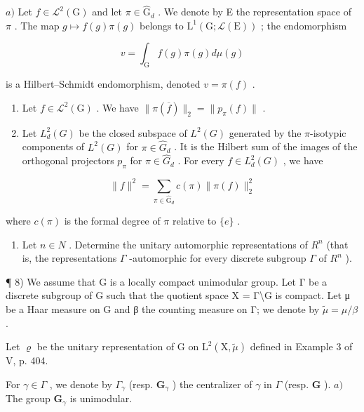 \(a)\) Let \(f \in \mathcal{L}^2(\mathrm{G})\) and let \(\pi \in \widehat{\mathrm{G}}_d\) . We denote by E the representation space of \(\pi\) . The map \(g \mapsto f(g)\pi(g)\) belongs to \(\mathrm{L}^1(\mathrm{G};\mathcal{L}(\mathrm{E}))\) ; the endomorphism

\[
v = \int_ {\mathrm{G}} f (g) \pi (g) d \mu (g)
\]

is a Hilbert--Schmidt endomorphism, denoted \(v = \pi(f)\) .

\begin{enumerate}
\def\labelenumi{\alph{enumi})}
\setcounter{enumi}{1}
\item
  Let \(f \in \mathcal{L}^2(\mathrm{G})\) . We have \(\| \pi(\overline{f}) \|_2 = \| p_\pi(f) \|\) .
\item
  Let \(L_{d}^{2}(G)\) be the closed subspace of \(L^{2}(G)\) generated by the \(\pi\)-isotypic components of \(L^{2}(G)\) for \(\pi \in \widehat{G}_{d}\) . It is the Hilbert sum of the images of the orthogonal projectors \(p_{\pi}\) for \(\pi \in \widehat{G}_{d}\) . For every \(f \in L_{d}^{2}(G)\) , we have
\end{enumerate}

\[
\| f \| ^ {2} = \sum_ {\pi \in \widehat {\mathrm{G}} _ {d}} c (\pi) \| \pi (f) \| _ {2} ^ {2}
\]

where \(c(\pi)\) is the formal degree of \(\pi\) relative to \(\{e\}\) .

\begin{enumerate}
\def\labelenumi{\arabic{enumi})}
\setcounter{enumi}{6}
\tightlist
\item
  Let \(n \in N\) . Determine the unitary automorphic representations of \(R^{n}\) (that is, the representations \(\Gamma\) -automorphic for every discrete subgroup \(\Gamma\) of \(R^{n}\) ).
\end{enumerate}

¶ 8) We assume that G is a locally compact unimodular group. Let Γ be a discrete subgroup of G such that the quotient space X = Γ\textbackslash G is compact. Let μ be a Haar measure on G and β the counting measure on Γ; we denote by \(\widetilde{\mu} = \mu/\beta\) .

Let \(\varrho\) be the unitary representation of G on \(\mathrm{L}^{2}(\mathrm{X},\widetilde{\mu})\) defined in Example 3 of V, p. 404.

For \(\gamma\in\Gamma\) , we denote by \(\Gamma_{\gamma}\) (resp. \(\mathbf{G}_{\gamma}\) ) the centralizer of \(\gamma\) in \(\Gamma\) (resp. \(\mathbf{G}\) ). \(a)\) The group \(\mathbf{G}_{\gamma}\) is unimodular.

